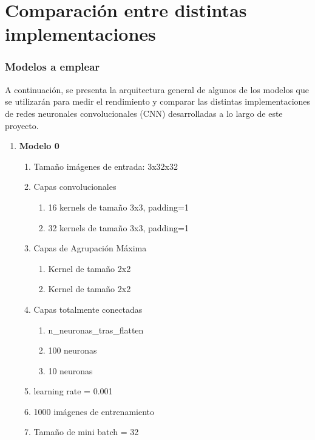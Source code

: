 \chapter{Comparación entre distintas implementaciones}

\subsection{Modelos a emplear}

A continuación, se presenta la arquitectura general de algunos de los modelos que se utilizarán para medir el rendimiento y comparar las distintas implementaciones de redes neuronales convolucionales (CNN) desarrolladas a lo largo de este proyecto.

\begin{enumerate}
	\item \textbf{Modelo 0}
	\begin{enumerate}[label=\textbullet, nosep]
		\item Tamaño imágenes de entrada: 3x32x32
		\item Capas convolucionales
			\begin{enumerate}[label=\textbullet, nosep]
				\item 16 kernels de tamaño 3x3, padding=1
				\item 32 kernels de tamaño 3x3, padding=1
			\end{enumerate}
		\item Capas de Agrupación Máxima
		\begin{enumerate}[label=\textbullet, nosep]
			\item Kernel de tamaño 2x2
			\item Kernel de tamaño 2x2
		\end{enumerate}
		\item Capas totalmente conectadas
		\begin{enumerate}[label=\textbullet, nosep]
			\item n\_neuronas\_tras\_flatten
			\item 100 neuronas
			\item 10 neuronas
		\end{enumerate}
		\item learning rate = 0.001
		\item 1000 imágenes de entrenamiento
		\item Tamaño de mini batch = 32
	\end{enumerate}
	

\end{enumerate}
